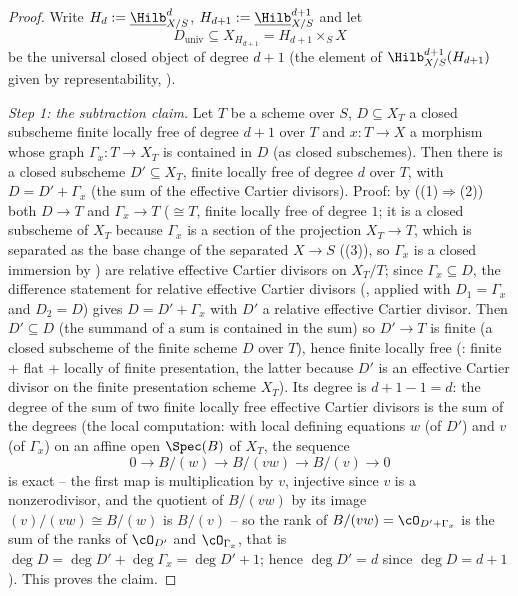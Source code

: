 \begin{proof}
Write $H_d:=\underline{\Hilb}^d_{X/S}$,
$H_{d+1}:=\underline{\Hilb}^{d+1}_{X/S}$ and let
\[
D_{\mathrm{univ}}\subseteq X_{H_{d+1}}=H_{d+1}\times_SX
\]
be the universal closed object of degree $d+1$ (the element of
$\Hilb^{d+1}_{X/S}(H_{d+1})$ given by representability,
).

\emph{Step 1: the subtraction claim.}  Let $T$ be a scheme over $S$,
$D\subseteq X_T$ a closed subscheme finite locally free of degree
$d+1$ over $T$ and $x:T\to X$ a morphism whose graph
$\Gamma_x:T\to X_T$ is contained in $D$ (as closed subschemes).  Then
there is a closed subscheme $D'\subseteq X_T$, finite locally free of
degree $d$ over $T$, with $D=D'+\Gamma_x$ (the sum of the effective
Cartier divisors).
Proof: by  ((1)$\Rightarrow$(2)) both
$D\to T$ and $\Gamma_x\to T$ ($\cong T$, finite locally free of degree
$1$; it is a closed subscheme of $X_T$ because $\Gamma_x$ is a section
of the projection $X_T\to T$, which is separated as the base change of
the separated $X\to S$ ((3)), so
$\Gamma_x$ is a closed immersion by
) are relative effective
Cartier divisors on $X_T/T$; since $\Gamma_x\subseteq D$, the difference
statement for relative effective Cartier divisors
(, applied with
$D_1=\Gamma_x$ and $D_2=D$) gives $D=D'+\Gamma_x$ with $D'$ a relative
effective Cartier divisor.  Then $D'\subseteq D$ (the summand of a sum is
contained in the sum) so $D'\to T$ is finite (a closed subscheme of
the finite scheme $D$ over $T$), hence finite locally free
(: finite + flat + locally of finite
presentation, the latter because $D'$ is an effective Cartier divisor
on the finite presentation scheme $X_T$).  Its degree is
$d+1-1=d$: the degree of the sum of two finite locally free effective
Cartier divisors is the sum of the degrees (the local computation:
with local defining equations $w$ (of $D'$) and $v$ (of $\Gamma_x$)
on an affine open $\Spec(B)$ of $X_T$, the sequence
\[
0\to B/(w)\to B/(vw)\to B/(v)\to0
\]
is exact -- the first map is multiplication by $v$, injective since
$v$ is a nonzerodivisor, and the quotient of $B/(vw)$ by its image
$(v)/(vw)\cong B/(w)$ is $B/(v)$ -- so the rank of
$B/(vw)=\cO_{D'+\Gamma_x}$ is the sum of the ranks of $\cO_{D'}$ and
$\cO_{\Gamma_x}$, that is $\deg D=\deg D'+\deg\Gamma_x=\deg D'+1$;
hence $\deg D'=d$ since $\deg D=d+1$).  This proves
the claim.


\end{proof}
